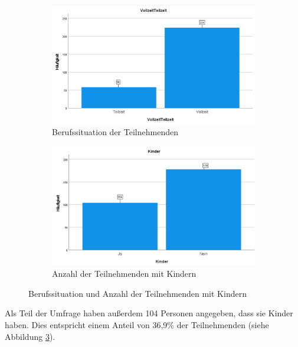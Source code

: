 \begin{figure}[h]
    \begin{subfigure}{0.49\textwidth}
        \centering
        \includegraphics[width=\textwidth]{04_Artefakte/01_Abbildungen/deskriptiv_teilzeit_vollzeit.png}
        \caption{Berufssituation der Teilnehmenden}
        \label{fig:berufssituation}
    \end{subfigure}
    \begin{subfigure}{0.49\textwidth}
        \centering
        \includegraphics[width=\textwidth]{04_Artefakte/01_Abbildungen/deskriptiv_kinder.png}
        \caption{Anzahl der Teilnehmenden mit Kindern}
        \label{fig:kinder}        
    \end{subfigure}
    \caption{Berufssituation und Anzahl der Teilnehmenden mit Kindern}
\end{figure}

Als Teil der Umfrage haben außerdem 104 Personen angegeben, dass sie Kinder haben. Dies entspricht einem Anteil von 36,9\% der 
Teilnehmenden (siehe Abbildung \ref{fig:kinder}).

